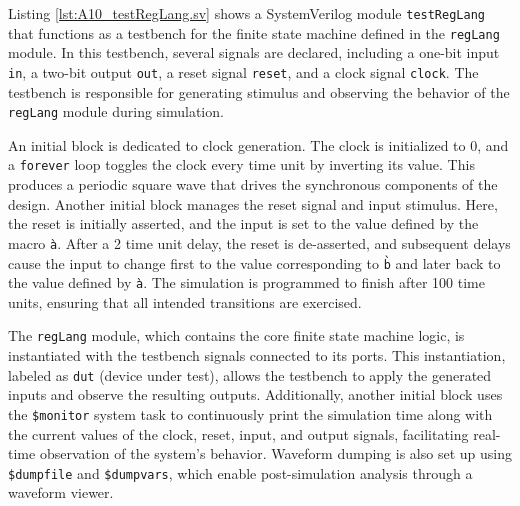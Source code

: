 \begin{exemplu}
{


Listing \ref{lst:A10_testRegLang.sv} shows a SystemVerilog module \texttt{testRegLang} that functions as a testbench for the finite state machine defined in the \texttt{regLang} module. In this testbench, several signals are declared, including a one-bit input \texttt{in}, a two-bit output \texttt{out}, a reset signal \texttt{reset}, and a clock signal \texttt{clock}. The testbench is responsible for generating stimulus and observing the behavior of the \texttt{regLang} module during simulation.

An initial block is dedicated to clock generation. The clock is initialized to 0, and a \texttt{forever} loop toggles the clock every time unit by inverting its value. This produces a periodic square wave that drives the synchronous components of the design. Another initial block manages the reset signal and input stimulus. Here, the reset is initially asserted, and the input is set to the value defined by the macro \texttt{\`a}. After a 2 time unit delay, the reset is de-asserted, and subsequent delays cause the input to change first to the value corresponding to \texttt{\`b} and later back to the value defined by \texttt{\`a}. The simulation is programmed to finish after 100 time units, ensuring that all intended transitions are exercised.

The \texttt{regLang} module, which contains the core finite state machine logic, is instantiated with the testbench signals connected to its ports. This instantiation, labeled as \texttt{dut} (device under test), allows the testbench to apply the generated inputs and observe the resulting outputs. Additionally, another initial block uses the \texttt{\$monitor} system task to continuously print the simulation time along with the current values of the clock, reset, input, and output signals, facilitating real-time observation of the system's behavior. Waveform dumping is also set up using \texttt{\$dumpfile} and \texttt{\$dumpvars}, which enable post-simulation analysis through a waveform viewer.
}%

\end{exemplu}
